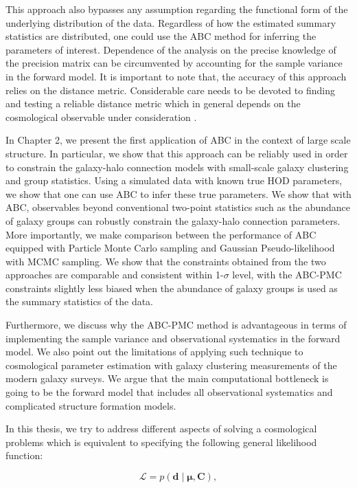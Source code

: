 This approach also bypasses any assumption regarding the functional form of the underlying distribution of the data. Regardless of how the estimated summary statistics are 
distributed, one could use the ABC method for inferring the parameters of interest.
Dependence of the analysis on the precise knowledge of the precision matrix can be circumvented by accounting for the sample variance 
in the forward model. It is important to note that, the accuracy of this approach relies on the distance metric. Considerable care needs to be devoted to finding and testing a 
reliable distance metric which in general depends on the cosmological observable under consideration \citep{abcsn,abcwl,jennings2016a,jennings2016b}. 

In Chapter 2, we present the first application of ABC in the context of large scale structure. In particular, we show that this approach can be reliably used in order to constrain 
the galaxy-halo connection models with small-scale galaxy clustering and group statistics. Using a simulated data with known true HOD parameters, we show that one can use ABC to infer these true parameters. We show that with ABC, observables beyond conventional two-point statistics such as the abundance of galaxy groups can robustly constrain the galaxy-halo connection parameters. More importantly, we make comparison between the performance of ABC equipped with Particle Monte Carlo sampling and Gaussian Pseudo-likelihood with MCMC sampling. We show that the constraints obtained from the two approaches are comparable and consistent within 1-$\sigma$ level, with the ABC-PMC constraints slightly less 
biased when the abundance of galaxy groups is used as the summary statistics of the data. 

Furthermore, we discuss why the ABC-PMC method is advantageous in terms of implementing the sample variance and observational systematics in the forward model.
We also point out the limitations of applying such technique to cosmological parameter estimation with galaxy clustering measurements of the modern galaxy surveys. 
We argue that the main computational bottleneck is going to be the forward model that includes all observational systematics and complicated structure formation models. 

In this thesis, we try to address different aspects of solving a cosmological problems which is equivalent to specifying the following general likelihood function:

\begin{equation}
\mathcal{L} = p(\mathbf{d} \; | \; \mathbf{\mu} , \mathbf{C}),
\end{equation}

